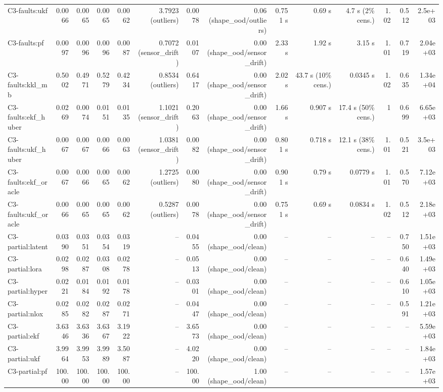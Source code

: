 \begin{table}[t]
\begin{tabular}{lrrrrrrrrrrrrr}
C3-faults:ukf & 0.0066 & 0.0065 & 0.0065 & 0.0062 & 3.7923 (outliers) & 0.0078 & 0.06 (shape\_ood/outliers) & 0.751 s & 0.69 s & 4.7 s (2\% cens.) & 1.02 & 0.512 & 2.5e+03 \\
C3-faults:pf & 0.0097 & 0.0096 & 0.0096 & 0.0087 & 0.7072 (sensor\_drift) & 0.0107 & 0.00 (shape\_ood/sensor\_drift) & 2.33 s & 1.92 s & 3.15 s & 1.01 & 0.719 & 2.04e+03 \\
C3-faults:kkl\_mb & 0.5002 & 0.4971 & 0.5279 & 0.4234 & 0.8534 (outliers) & 0.6417 & 0.00 (shape\_ood/sensor\_drift) & 2.02 s & 43.7 s (10\% cens.) & 0.0345 s & 1.02 & 0.635 & 1.34e+04 \\
C3-faults:ekf\_huber & 0.0269 & 0.0074 & 0.0151 & 0.0135 & 1.1021 (sensor\_drift) & 0.2063 & 0.00 (shape\_ood/sensor\_drift) & 1.66 s & 0.907 s & 17.4 s (50\% cens.) & 1 & 0.699 & 6.65e+03 \\
C3-faults:ukf\_huber & 0.0067 & 0.0067 & 0.0066 & 0.0063 & 1.0381 (sensor\_drift) & 0.0082 & 0.00 (shape\_ood/sensor\_drift) & 0.801 s & 0.718 s & 12.1 s (38\% cens.) & 1.01 & 0.521 & 3.5e+03 \\
C3-faults:ekf\_oracle & 0.0067 & 0.0066 & 0.0065 & 0.0062 & 1.2725 (outliers) & 0.0080 & 0.00 (shape\_ood/sensor\_drift) & 0.901 s & 0.79 s & 0.0779 s & 1.01 & 0.570 & 7.12e+03 \\
C3-faults:ukf\_oracle & 0.0066 & 0.0065 & 0.0065 & 0.0062 & 0.5287 (outliers) & 0.0078 & 0.00 (shape\_ood/sensor\_drift) & 0.751 s & 0.69 s & 0.0834 s & 1.02 & 0.512 & 2.18e+03 \\
C3-partial:latent & 0.0390 & 0.0351 & 0.0354 & 0.0319 & – & 0.0455 & 0.00 (shape\_ood/clean) & – & – & – & – & 0.750 & 1.51e+03 \\
C3-partial:lora & 0.0298 & 0.0287 & 0.0308 & 0.0278 & – & 0.0513 & 0.00 (shape\_ood/clean) & – & – & – & – & 0.640 & 1.49e+03 \\
C3-partial:hyper & 0.0221 & 0.0184 & 0.0192 & 0.0178 & – & 0.0301 & 0.00 (shape\_ood/clean) & – & – & – & – & 0.610 & 1.05e+03 \\
C3-partial:nlox & 0.0285 & 0.0282 & 0.0287 & 0.0271 & – & 0.0447 & 0.00 (shape\_ood/clean) & – & – & – & – & 0.591 & 1.21e+03 \\
C3-partial:ekf & 3.6346 & 3.6336 & 3.6367 & 3.1922 & – & 3.6573 & 0.00 (shape\_ood/clean) & – & – & – & – & – & 5.59e+03 \\
C3-partial:ukf & 3.9964 & 3.9953 & 3.9989 & 3.5087 & – & 4.0220 & 0.00 (shape\_ood/clean) & – & – & – & – & – & 1.84e+03 \\
C3-partial:pf & 100.00 & 100.00 & 100.00 & 100.00 & – & 100.00 & 1.00 (shape\_ood/clean) & – & – & – & – & – & 1.57e+03 \\

\end{tabular}
\end{table}
